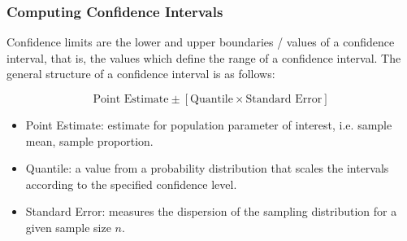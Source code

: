 \documentclass[a4]{beamer}
\begin{document}
\begin{frame}
\frametitle{Computing Confidence Intervals}
Confidence limits are the lower and upper boundaries / values of a confidence interval, that is, the values which define the range of a confidence interval. The general structure of a confidence interval is as follows:

\[ \mbox{Point Estimate}  \pm \left[ \mbox{Quantile} \times \mbox{Standard Error} \right] \]


\begin{itemize}
\item Point Estimate: estimate for population parameter of interest, i.e. sample mean, sample proportion.
\item Quantile: a value from a probability distribution that scales the intervals according to the specified confidence level.
\item Standard Error: measures the dispersion of the sampling distribution for a given sample size $n$.
\end{itemize}
\end{frame}


\end{document}

